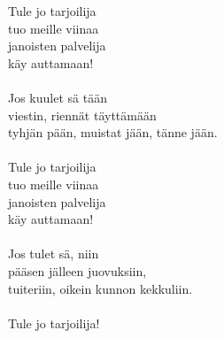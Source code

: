 
Tule jo tarjoilija \\ tuo meille viinaa \\ janoisten palvelija \\ käy auttamaan! \\ \hspace{10mm} \\ Jos kuulet sä tään \\ viestin, riennät täyttämään \\ tyhjän pään, muistat jään, tänne jään. \\ \hspace{10mm} \\ Tule jo tarjoilija \\ tuo meille viinaa \\ janoisten palvelija \\ käy auttamaan! \\ \hspace{10mm} \\ Jos tulet sä, niin \\ pääsen jälleen juovuksiin, \\ tuiteriin, oikein kunnon kekkuliin. \\ \hspace{10mm} \\ Tule jo tarjoilija!